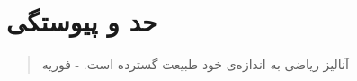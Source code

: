 \chapter{حد و پیوستگی}
\thispagestyle{empty}

\begin{quote}
	{\lotus
		آنالیز ریاضی به اندازه‌ی خود طبیعت گسترده است. \quad - فوریه%
	}
\end{quote}
